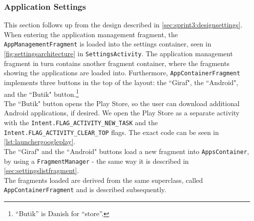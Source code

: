 \subsubsection{Application Settings}
This section follows up from the design described in \cref{sec:sprint3:designsettings}.
When entering the application management fragment, the \lstinline!AppManagementFragment! is loaded into the settings container, seen in \cref{fig:settingsarchitecture} in \lstinline!SettingsActivity!.
The application management fragment in turn contains another fragment container, where the fragments showing the applications are loaded into.
Furthermore, \lstinline!AppContainerFragment! implements three buttons in the top of the layout: the ``Giraf", the ``Android", and the ``Butik" button.\footnote{``Butik'' is Danish for ``store''.}\\

The ``Butik" button opens the  Play Store, so the user can download additional Android applications, if desired. 
We open the Play Store as a separate activity with the \lstinline!Intent.FLAG_ACTIVITY_NEW_TASK! and the \lstinline!Intent.FLAG_ACTIVITY_CLEAR_TOP! flags.
The exact code can be seen in \cref{lst:launchergoogleplay}.\\

The ``Giraf" and the ``Android" buttons load a new fragment into  \lstinline!AppsContainer!, by using a \lstinline!FragmentManager! - the same way it is described in \cref{sec:settingslistfragment}.\\

The fragments loaded are derived from the same superclass, called \lstinline|AppContainerFragment| and is described subsequently.
%

